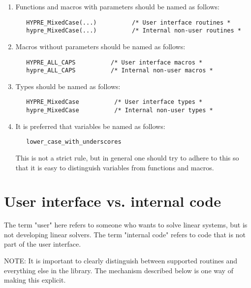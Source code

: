 \begin{enumerate}

\item Functions and macros with parameters should be named as follows:

\begin{verbatim}
   HYPRE_MixedCase(...)          /* User interface routines *
   hypre_MixedCase(...)          /* Internal non-user routines *
\end{verbatim}

\item Macros without parameters should be named as follows:

\begin{verbatim}
   HYPRE_ALL_CAPS          /* User interface macros *
   hypre_ALL_CAPS          /* Internal non-user macros *
\end{verbatim}

\item Types should be named as follows:

\begin{verbatim}
   HYPRE_MixedCase          /* User interface types *
   hypre_MixedCase          /* Internal non-user types *
\end{verbatim}

\item It is preferred that variables be named as follows:

\begin{verbatim}
   lower_case_with_underscores
\end{verbatim}

This is not a strict rule, but in general one should try to adhere to
this so that it is easy to distinguish variables from functions and
macros.

\end{enumerate}
 
\section{User interface vs. internal code}
\label{User interface vs. internal code}

The term "user" here refers to someone who wants to solve linear systems,
but is not developing linear solvers.  The term "internal code" refers to
code that is not part of the user interface.

NOTE: It is important to clearly distinguish between supported
routines and everything else in the library.  The mechanism described
below is one way of making this explicit.

